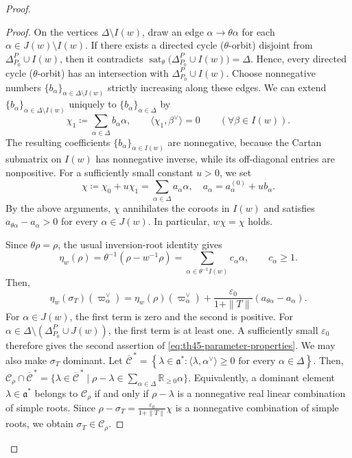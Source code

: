 \documentclass[12pt]{amsart}
\theoremstyle{definition}
\theoremstyle{plain}
\theoremstyle{remark}
\numberwithin{equation}{section}
\newcommand{\sC}{\mathscr{C}}
\begin{document}
\begin{proof}
\begin{proof}
On the vertices $\Delta\setminus I(w)$, draw an edge $\alpha\longrightarrow\theta\alpha$ for each
$\alpha\in J(w)\setminus I(w)$.
If there exists a directed cycle ($\theta$-orbit) disjoint from
$\Delta_{P_0}^P\cup I(w)$, then it contradicts $\operatorname{sat}_\theta\bigl(\Delta_{P_0}^P\cup I(w)\bigr)
 =\Delta$.
Hence, every directed cycle ($\theta$-orbit) has an intersection with $\Delta_{P_0}^P\cup I(w)$. 
Choose nonnegative numbers $\{ b_\alpha \}_{\alpha\in\Delta\setminus I(w)}$ strictly increasing along these edges.
We can extend $\{ b_\alpha \}_{\alpha\in\Delta\setminus I(w)}$ uniquely to $\{ b_\alpha \}_{\alpha\in\Delta}$ by
\[\chi_1\coloneqq \sum_{\alpha\in\Delta}b_\alpha\alpha, \qquad 
 \langle  \chi_1,    \beta^\vee\rangle=0
 \qquad(\forall \beta\in I(w)).
\]
The resulting coefficients $\{ b_\alpha \}_{\alpha\in I(w)}$ are nonnegative, because the Cartan submatrix on
$I(w)$ has nonnegative inverse, while its off-diagonal entries are
nonpositive.
For a sufficiently small constant $u>0$, we set
\[
 \chi\coloneqq \chi_0+u\chi_1=\sum_{\alpha\in\Delta} a_\alpha \alpha,\quad a_\alpha=a_\alpha^{(0)}+ub_\alpha.
\]
By the above arguments, $\chi$ annihilates the coroots in $I(w)$ and satisfies
$a_{\theta\alpha}-a_\alpha>0$ for every $\alpha\in J(w)$.
In particular, $w\chi=\chi$ holds.



Since \(\theta\rho=\rho\), the usual inversion-root identity gives
\begin{equation}\label{eq:th45-eta-rho}
 \eta_w(\rho)=\theta^{-1}(\rho-w^{-1}\rho)
 =\sum_{\alpha\in\theta^{-1}I(w)}c_\alpha\alpha,
 \qquad c_\alpha\geq1.
\end{equation}
Then,
\[
 \eta_w(\sigma_T)(\varpi_\alpha^\vee)
 =\eta_w(\rho)(\varpi_\alpha^\vee)
   +\frac{\varepsilon_0}{1+\|T\|}
                      (a_{\theta\alpha}-a_\alpha).
\]
For $\alpha\in J(w)$, the first term is zero and the second is
positive.
For $\alpha\in\Delta\setminus(\Delta_{P_0}^P\cup J(w))$,
the first term is at least one.
A sufficiently small $\varepsilon_0$ therefore gives the second
assertion of \eqref{eq:th45-parameter-properties}.
We may also make $\sigma_T$ dominant.
Let $\overline{\mathcal C}^{\,*}= \left\{
 \lambda\in\mathfrak a^*:
 \langle\lambda,\alpha^\vee\rangle\ge0
 \text{ for every }\alpha\in\Delta
 \right\}$.
Then, $\sC_\rho\cap\overline{\mathcal C}^{\,*}
 = \{ \lambda\in\overline{\mathcal C}^{\,*} \mid
 \rho-\lambda\in \sum_{\alpha\in\Delta}\mathbb R_{\ge0}\alpha\}$.
Equivalently, a dominant element \(\lambda\in\mathfrak a^*\)
belongs to $\sC_\rho$ if and only if $\rho-\lambda$ is a nonnegative real linear combination
of simple roots. 
Since $\rho-\sigma_T=\frac{\varepsilon_0}{1+\|T\|}\chi$ is a nonnegative combination of simple roots, we obtain $\sigma_T\in\sC_\rho$.
\end{proof}


\end{proof}
\end{document}
